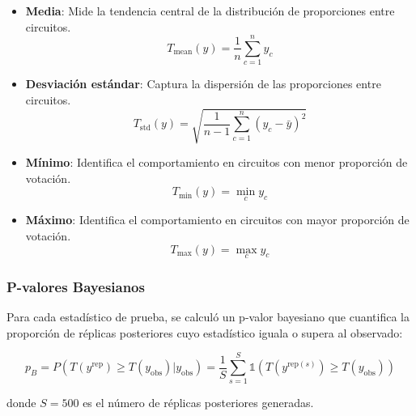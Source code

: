\begin{itemize}
    \item \textbf{Media}: Mide la tendencia central de la distribuci\'on de proporciones entre circuitos.
    \begin{equation}
    T_{\text{mean}}(y) = \frac{1}{n}\sum_{c=1}^{n} y_c
    \end{equation}

    \item \textbf{Desviaci\'on est\'andar}: Captura la dispersi\'on de las proporciones entre circuitos.
    \begin{equation}
    T_{\text{std}}(y) = \sqrt{\frac{1}{n-1}\sum_{c=1}^{n} (y_c - \bar{y})^2}
    \end{equation}

    \item \textbf{M\'inimo}: Identifica el comportamiento en circuitos con menor proporci\'on de votaci\'on.
    \begin{equation}
    T_{\text{min}}(y) = \min_{c} y_c
    \end{equation}

    \item \textbf{M\'aximo}: Identifica el comportamiento en circuitos con mayor proporci\'on de votaci\'on.
    \begin{equation}
    T_{\text{max}}(y) = \max_{c} y_c
    \end{equation}
\end{itemize}

\subsubsection{P-valores Bayesianos}

Para cada estad\'istico de prueba, se calcul\'o un p-valor bayesiano que cuantifica la proporci\'on de r\'eplicas posteriores cuyo estad\'istico iguala o supera al observado:

\begin{equation}
p_B = P(T(y^{\text{rep}}) \geq T(y_{\text{obs}}) | y_{\text{obs}}) = \frac{1}{S}\sum_{s=1}^{S} \mathbb{1}(T(y^{\text{rep}(s)}) \geq T(y_{\text{obs}}))
\end{equation}

donde $S = 500$ es el n\'umero de r\'eplicas posteriores generadas.

